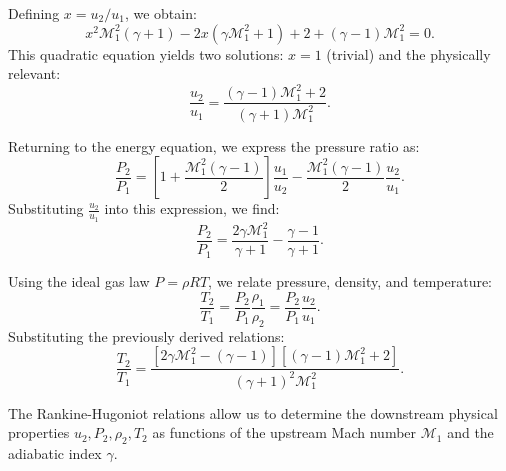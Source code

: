 Defining \( x = u_2 / u_1 \), we obtain:
\begin{equation}
x^2 \mathcal{M}_1^2 (\gamma + 1) - 2x (\gamma \mathcal{M}_1^2 + 1) + 2 + (\gamma - 1) \mathcal{M}_1^2 = 0.
\end{equation}
This quadratic equation yields two solutions: \(x = 1\) (trivial) and the physically relevant:
\begin{equation}
\frac{u_2}{u_1} = \frac{(\gamma - 1) \mathcal{M}_1^2 + 2}{(\gamma + 1) \mathcal{M}_1^2}.
\end{equation}

Returning to the energy equation, we express the pressure ratio as:
\begin{equation}
\frac{P_2}{P_1} = \left[1 + \frac{\mathcal{M}_1^2(\gamma - 1)}{2} \right] \frac{u_1}{u_2} - \frac{\mathcal{M}_1^2(\gamma - 1)}{2} \frac{u_2}{u_1}.
\end{equation}
Substituting \(\frac{u_2}{u_1}\) into this expression, we find:
\begin{equation}
\frac{P_2}{P_1} = \frac{2\gamma \mathcal{M}_1^2}{\gamma + 1} - \frac{\gamma - 1}{\gamma + 1}.
\end{equation}

Using the ideal gas law \(P = \rho R T\), we relate pressure, density, and temperature:
\begin{equation}
\frac{T_2}{T_1} = \frac{P_2}{P_1} \frac{\rho_1}{\rho_2} = \frac{P_2}{P_1} \frac{u_2}{u_1}.
\end{equation}
Substituting the previously derived relations:
\begin{equation}
\frac{T_2}{T_1} = \frac{\left[ 2 \gamma \mathcal{M}_1^2 - (\gamma - 1) \right] \left[ (\gamma - 1) \mathcal{M}_1^2 + 2 \right]}{(\gamma + 1)^2 \mathcal{M}_1^2}.
\end{equation}

The Rankine-Hugoniot relations allow us to determine the downstream physical properties \(u_2, P_2, \rho_2, T_2\) as functions of the upstream Mach number \(\mathcal{M}_1\) and the adiabatic index \(\gamma\). 
